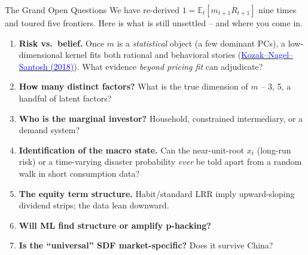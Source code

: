 \documentclass{beamer}
\newcommand{\E}{\mathbb{E}}
\begin{document}
\begin{frame}{The Grand Open Questions}
We have re-derived $1=\E_t[m_{t+1}R_{t+1}]$ nine times and toured five frontiers. Here is what is \alert{still unsettled} -- and where you come in.
\begin{enumerate}
  \item \textbf{Risk vs.\ belief.} Once $m$ is a \emph{statistical} object (a few dominant PCs), a low-dimensional kernel fits \alert{both} rational and behavioral stories (\href{https://doi.org/10.1111/jofi.12612}{\textcolor{blue}{Kozak--Nagel--Santosh (2018)}}). What evidence \emph{beyond pricing fit} can adjudicate?
  \item \textbf{How many distinct factors?} What is the true dimension of $m$ -- 3, 5, a handful of latent factors?
  \item \textbf{Who is the marginal investor?} Household, constrained intermediary, or a demand system?
  \item \textbf{Identification of the macro state.} Can the near-unit-root $x_t$ (long-run risk) or a time-varying disaster probability \emph{ever} be told apart from a random walk in short consumption data?
  \item \textbf{The equity term structure.} Habit/standard LRR imply upward-sloping dividend strips; the data lean \alert{downward}.
  \item \textbf{Will ML find structure or amplify p-hacking?}
  \item \textbf{Is the ``universal'' SDF market-specific?} Does it survive China?
\end{enumerate}
\end{frame}
\end{document}
